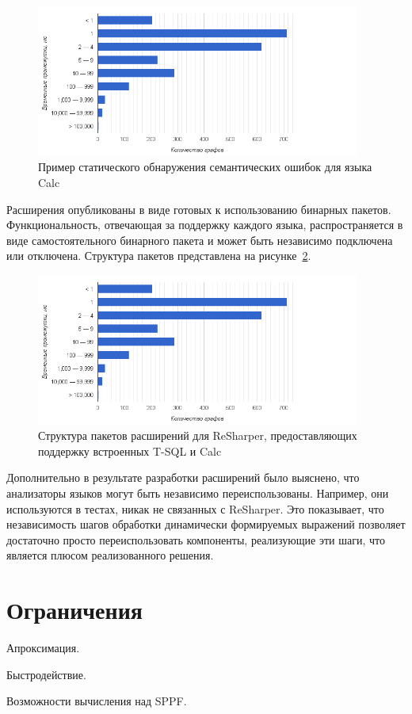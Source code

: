\begin{figure}[H]
  \centering
 \includegraphics[width=0.95\textwidth]{pics/distr.png}
 \caption{Пример статического обнаружения семантических ошибок для языка Calc}
 \label{fig:undeclaredVars}
\end{figure}

Расширения опубликованы в виде готовых к использованию бинарных пакетов. Функциональность, отвечающая за поддержку каждого языка, распространяется в виде самостоятельного бинарного пакета и может быть независимо подключена или отключена. Структура пакетов представлена на рисунке~\ref{fig:packagesStructure}.

\begin{figure}[H]
  \centering
 \includegraphics[width=0.95\textwidth]{pics/distr.png}
 \caption{Структура пакетов расширений для ReSharper, предоставляющих поддержку встроенных T-SQL и Calc}
 \label{fig:packagesStructure}
\end{figure}

Дополнительно в результате разработки расширений было выяснено, что анализаторы языков могут быть независимо переиспользованы. Например, они используются в тестах, никак не связанных с ReSharper. Это показывает, что независимость шагов обработки динамически формируемых выражений позволяет достаточно просто переиспользовать компоненты, реализующие эти шаги, что является плюсом реализованного решения.

\section{Ограничения}

Апроксимация.

Быстродействие.

Возможности вычисления над SPPF.
